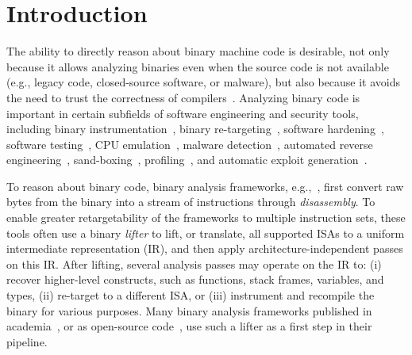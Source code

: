 \section{Introduction}
\label{sec:Intro}


The ability to directly reason about binary machine code is desirable, not only
because it allows analyzing binaries even when the source code is not
available (e.g., legacy code, closed-source software, or malware), but also
because it avoids the need to trust the correctness of
compilers~\cite{Thompson,WYSINWYE}.  Analyzing binary code is important in
certain subfields of software engineering and security tools,
including binary
instrumentation~\cite{Bruening:CGO2003,PEBIL10,Pin:2005,Valgrind:ENTCS03,DynamoRIO:2004},
binary re-targeting~\cite{UQBT:2000,Retarget11}, software
hardening~\cite{Cha:2015,Ford:2008,Zhang,Zhang:2013}, software
testing~\cite{Chipounov:2011,Avgerinos:2014,godefroid_automated_2008}, CPU
emulation~\cite{QEMU:USENIX05,Magnusson:2002}, malware
detection~\cite{Christodorescu:2005,Kruegel:2004,BitBlaze:2008,BAP:CAV11,Egele:USENIX07,Yin:CCS07},
automated reverse
engineering~\cite{Cui:2008,Lin:2008,Schwartz:2013,Yakdan2015NDSS,McSema:Recon14,Angr,Radare2},
sand-boxing~\cite{Kiriansky:2002:SEV,Erlingsson:2006,Yee:2009},
profiling~\cite{Harris:2005,Srivastava:1994}, and automatic exploit
generation~\cite{Cha:2012}.


To reason about binary code, binary analysis frameworks,
e.g.,~\cite{McSema:Recon14,Remill,Angr1,BAP:CAV11,Radare2}, first convert
raw bytes from the binary into a stream of instructions through
\emph{disassembly}.
%
To enable greater retargetability of the frameworks to multiple instruction sets,
these tools often use a binary \emph{lifter} to lift, or translate, all supported
ISAs to a uniform intermediate representation (IR), and then apply 
architecture-independent passes on this IR.
%
After lifting, several analysis passes may operate on the IR to: 
(i) recover higher-level constructs, such as functions,
stack frames, variables, and types, (ii) re-target to a different ISA, or 
(iii) instrument and recompile the binary for various purposes.
%
Many binary analysis frameworks published in
academia~\cite{BAP:CAV11,BitBlaze:2008,Fokin:2011,eschulte2018bed}, or
as open-source code~\cite{McSema:Recon14,Remill,Angr1,Radare2,FCD}, use
such a lifter as a first step in their pipeline.

